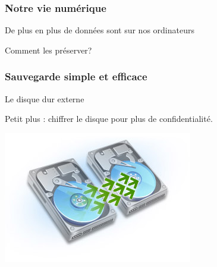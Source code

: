 \documentclass{beamer}
\begin{document}
\begin{frame}
\frametitle{Notre vie numérique}

\begin{block}{De plus en plus de données sont sur nos ordinateurs}
\begin{itemize}
\end{itemize}
Comment les préserver?
\end{block}
\end{frame}

\begin{frame}
\frametitle{Sauvegarde simple et efficace}

\begin{block}{Le disque dur externe}
\begin{itemize}
\end{itemize}
Petit plus : chiffrer le disque pour plus de confidentialité.
\end{block}
\begin{center}
\includegraphics[scale=0.5] {./images/backup.jpg}
\end{center}

\end{frame}
\end{document}

